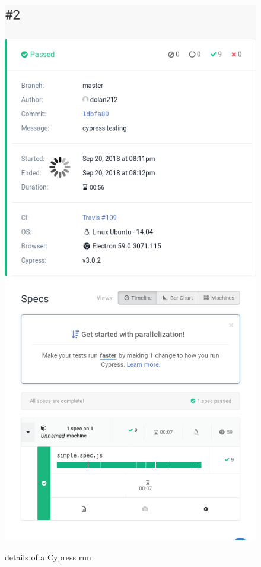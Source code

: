 \documentclass{article}
\begin{document}
\begin{figure}[h]
    \centering
    \includegraphics{cypress_run_1}
    \includegraphics{cypress_run_2}
    \caption{details of a Cypress run}
\end{figure}
\end{document}
